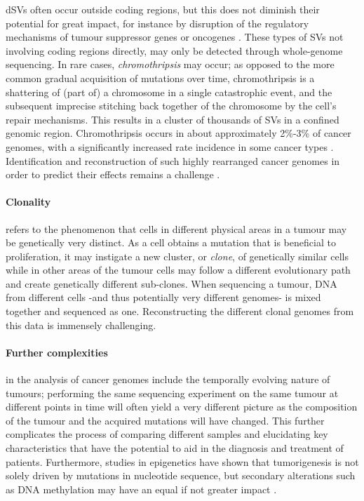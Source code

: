 \begin{justify}
dSVs often occur outside coding regions, but this does not diminish their potential for great impact, for instance by disruption of the regulatory mechanisms of tumour suppressor genes or oncogenes \cite{TODO}. These types of SVs not involving coding regions directly, may only be detected through whole-genome sequencing. In rare cases, \emph{chromothripsis} may occur; as opposed to the more common gradual acquisition of mutations over time, chromothripsis is a shattering of (part of) a chromosome in a single catastrophic event, and the subsequent imprecise stitching back together of the chromosome by the cell's repair mechanisms. This results in a cluster of thousands of SVs in a confined genomic region. Chromothripsis occurs in about approximately 2\%-3\% of cancer genomes, with a significantly increased rate incidence in some cancer types \cite{luijten2018}. Identification and reconstruction of such highly rearranged cancer genomes in order to predict their effects remains a challenge \cite{yang2016chromothripsis,govind2014}.



\paragraph{Clonality} refers to the phenomenon that cells in different physical areas in a tumour may be genetically very distinct. As a cell obtains a mutation that is beneficial to proliferation, it may instigate a new cluster, or \textit{clone}, of genetically similar cells while in other areas of the tumour cells may follow a different evolutionary path and create genetically different sub-clones. When sequencing a tumour, DNA from different cells -and thus potentially very different genomes- is mixed together and sequenced as one. Reconstructing the different clonal genomes from this data is immensely challenging.

\paragraph{Further complexities} in the analysis of cancer genomes include the temporally evolving nature of tumours; performing the same sequencing experiment on the same tumour at different points in time will often yield a very different picture as the composition of the tumour and the acquired mutations will have changed. This further complicates the process of comparing different samples and elucidating key characteristics that have the potential to aid in the diagnosis and treatment of patients. Furthermore, studies in epigenetics have shown that tumorigenesis is not solely driven by mutations in nucleotide sequence, but secondary alterations such as DNA methylation may have an equal if not greater impact \cite{pacchierotti2015environmental}.


\end{justify}
